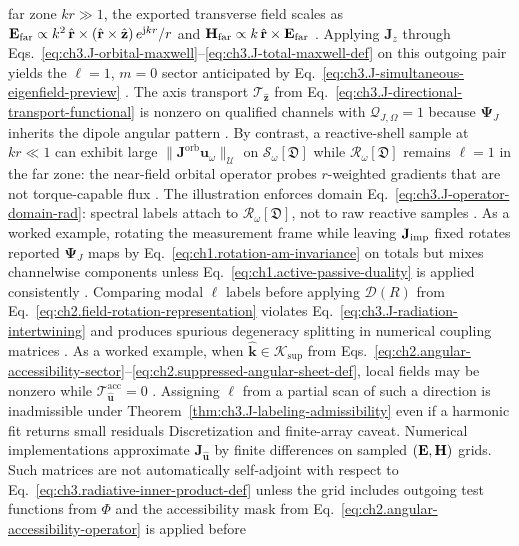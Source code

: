 far zone \(kr\gg 1\), the exported transverse field scales as
\(\mathbf{E}_{\mathrm{far}}\propto k^{2}\,\hat{\mathbf{r}}\times(\hat{\mathbf{r}}\times\hat{\mathbf{z}})\,e^{\mathrm{j} kr}/r\)
and \(\mathbf{H}_{\mathrm{far}}\propto k\,\hat{\mathbf{r}}\times\mathbf{E}_{\mathrm{far}}\) .
Applying \(\mathbf{J}_{z}\) through Eqs.~\eqref{eq:ch3.J-orbital-maxwell}--\eqref{eq:ch3.J-total-maxwell-def}
on this outgoing pair yields the \(\ell=1\), \(m=0\) sector anticipated by
Eq.~\eqref{eq:ch3.J-simultaneous-eigenfield-preview} . The axis transport
\(\mathcal{T}_{\hat{\mathbf{z}}}\) from Eq.~\eqref{eq:ch3.J-directional-transport-functional} is nonzero on
qualified channels with \(\mathcal{Q}_{J,\Omega}=1\) because \(\boldsymbol{\Psi}_J\) inherits the dipole
angular pattern . By contrast, a reactive-shell sample at \(kr\ll 1\) can
exhibit large \(\|\mathbf{J}^{\mathrm{orb}}\mathbf{u}_\omega\|_{\mathcal{U}}\) on
\(\mathcal{S}_\omega[\mathfrak{D}]\) while \(\mathcal{R}_\omega[\mathfrak{D}]\) remains \(\ell=1\) in the far
zone: the near-field orbital operator probes \(r\)-weighted gradients that are not torque-capable flux
. The illustration enforces domain
Eq.~\eqref{eq:ch3.J-operator-domain-rad}: spectral labels attach to
\(\mathcal{R}_\omega[\mathfrak{D}]\), not to raw reactive samples .
As a worked example, rotating the measurement frame while leaving \(\mathbf{J}_{\mathrm{imp}}\) fixed rotates reported \(\boldsymbol{\Psi}_J\) maps by
Eq.~\eqref{eq:ch1.rotation-am-invariance} on totals but mixes channelwise components unless
Eq.~\eqref{eq:ch1.active-passive-duality} is applied consistently . Comparing
modal \(\ell\) labels before applying \(\mathcal{D}(R)\) from Eq.~\eqref{eq:ch2.field-rotation-representation}
violates Eq.~\eqref{eq:ch3.J-radiation-intertwining} and produces spurious degeneracy splitting in numerical
coupling matrices .
As a worked example, when \(\widehat{\mathbf{k}}\in\mathcal{K}_{\mathrm{sup}}\) from
Eqs.~\eqref{eq:ch2.angular-accessibility-sector}--\eqref{eq:ch2.suppressed-angular-sheet-def}, local fields
may be nonzero while \(\mathcal{T}_{\hat{\mathbf{u}}}^{\mathrm{acc}}=0\) .
Assigning \(\ell\) from a partial scan of such a direction is inadmissible under
Theorem~\ref{thm:ch3.J-labeling-admissibility} even if a harmonic fit returns small residuals
Discretization and finite-array caveat. Numerical implementations approximate \(\mathbf{J}_{\hat{\mathbf{u}}}\) by finite differences on sampled
\((\mathbf{E},\mathbf{H})\) grids. Such matrices are not automatically self-adjoint with respect to
Eq.~\eqref{eq:ch3.radiative-inner-product-def} unless the grid includes outgoing test functions from
\(\Phi\) and the accessibility mask from Eq.~\eqref{eq:ch2.angular-accessibility-operator} is applied before
